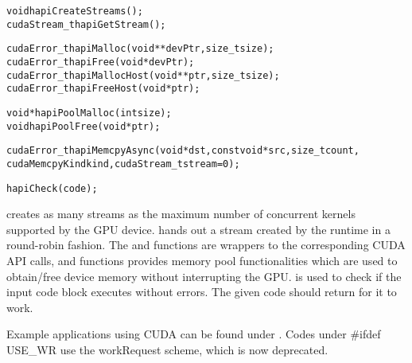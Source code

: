 \begin{alltt}
  void hapiCreateStreams();
  cudaStream_t hapiGetStream();

  cudaError_t hapiMalloc(void** devPtr, size_t size);
  cudaError_t hapiFree(void* devPtr);
  cudaError_t hapiMallocHost(void** ptr, size_t size);
  cudaError_t hapiFreeHost(void* ptr);

  void* hapiPoolMalloc(int size);
  void hapiPoolFree(void* ptr);

  cudaError_t hapiMemcpyAsync(void* dst, const void* src, size_t count,
                              cudaMemcpyKind kind, cudaStream_t stream = 0);

  hapiCheck(code);
\end{alltt}

 creates as many streams as the maximum number of
concurrent kernels supported by the GPU device.  hands
out a stream created by the runtime in a round-robin fashion. The
 and  functions are wrappers to the corresponding
CUDA API calls, and  functions provides memory pool functionalities
which are used to obtain/free device memory without interrupting the GPU.
 is used to check if the input code block executes without errors.
The given code should return  for it to work.

Example \charmpp{} applications using CUDA can be found under
. Codes under #ifdef USE_WR use the workRequest
scheme, which is now deprecated.
